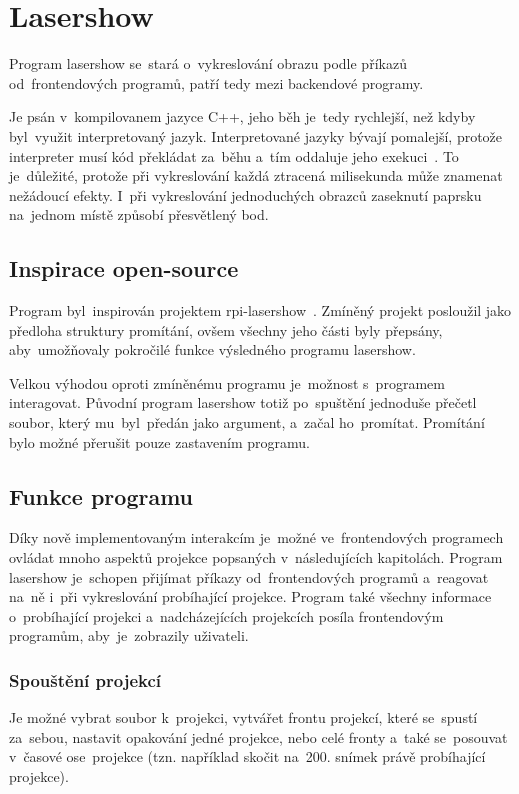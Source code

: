 \section{Lasershow}
Program lasershow se~stará o~vykreslování obrazu podle příkazů od~frontendových programů, patří tedy mezi backendové programy.

Je psán v~kompilovanem jazyce C++, jeho běh je~tedy rychlejší, než kdyby byl~využit interpretovaný jazyk.
Interpretované jazyky bývají pomalejší, protože interpreter musí kód překládat za~běhu a~tím oddaluje jeho exekuci~\cite{interpret}.
To je~důležité, protože při vykreslování každá ztracená milisekunda může znamenat nežádoucí efekty. I~při vykreslování jednoduchých obrazců zaseknutí paprsku na~jednom místě způsobí přesvětlený bod.

\subsection{Inspirace open-source}
Program byl~inspirován projektem rpi-lasershow~\cite{rpi-lasershow}. Zmíněný projekt posloužil jako předloha struktury promítání, ovšem všechny jeho části byly přepsány, aby~umožňovaly pokročilé funkce výsledného programu lasershow.

Velkou výhodou oproti zmíněnému programu je~možnost s~programem interagovat.
Původní program lasershow totiž po~spuštění jednoduše přečetl soubor, který mu~byl~předán jako argument, a~začal ho~promítat. Promítání bylo možné přerušit pouze zastavením programu.

\subsection{Funkce programu}
Díky nově implementovaným interakcím je~možné ve~frontendových programech ovládat mnoho aspektů projekce popsaných v~následujících kapitolách. Program lasershow je~schopen přijímat příkazy od~frontendových programů a~reagovat na~ně i~při vykreslování probíhající projekce. Program také všechny informace o~probíhající projekci a~nadcházejících projekcích posíla frontendovým programům, aby~je~zobrazily uživateli.

\subsubsection{Spouštění projekcí}
Je možné vybrat soubor k~projekci, vytvářet frontu projekcí, které se~spustí za~sebou, nastavit opakování jedné projekce, nebo celé fronty a~také se~posouvat v~časové ose~projekce (tzn. například skočit na~200. snímek právě probíhající projekce).

